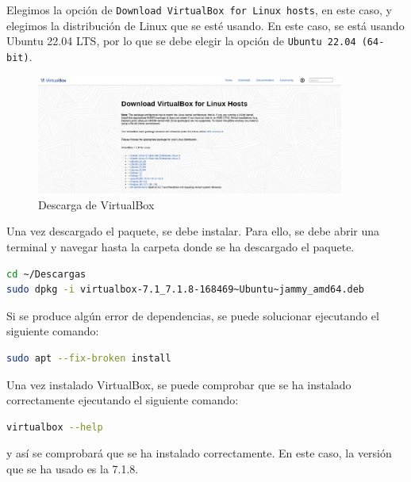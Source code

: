 \noindent
Elegimos la opción de \texttt{Download VirtualBox for Linux hosts}, en este caso, y elegimos la distribución de Linux que se esté usando. En este caso, se está usando Ubuntu 22.04 LTS, por lo que se debe elegir la opción de \texttt{Ubuntu 22.04 (64-bit)}.

\begin{figure}[H]
	\centering
	\includegraphics[width=0.9\textwidth]{images/virtualbox_download_2.png}
	\caption{Descarga de VirtualBox}
	\label{fig:virtualbox_download_2}
\end{figure}

\noindent
Una vez descargado el paquete, se debe instalar. Para ello, se debe abrir una terminal y navegar hasta la carpeta donde se ha descargado el paquete.
\begin{lstlisting}[language=bash]
cd ~/Descargas
sudo dpkg -i virtualbox-7.1_7.1.8-168469~Ubuntu~jammy_amd64.deb
\end{lstlisting}

\noindent
Si se produce algún error de dependencias, se puede solucionar ejecutando el siguiente comando:
\begin{lstlisting}[language=bash]
sudo apt --fix-broken install
\end{lstlisting}

\noindent
Una vez instalado VirtualBox, se puede comprobar que se ha instalado correctamente ejecutando el siguiente comando:
\begin{lstlisting}[language=bash]
virtualbox --help
\end{lstlisting}

\noindent
y así se comprobará que se ha instalado correctamente. En este caso, la versión que se ha usado es la 7.1.8.

